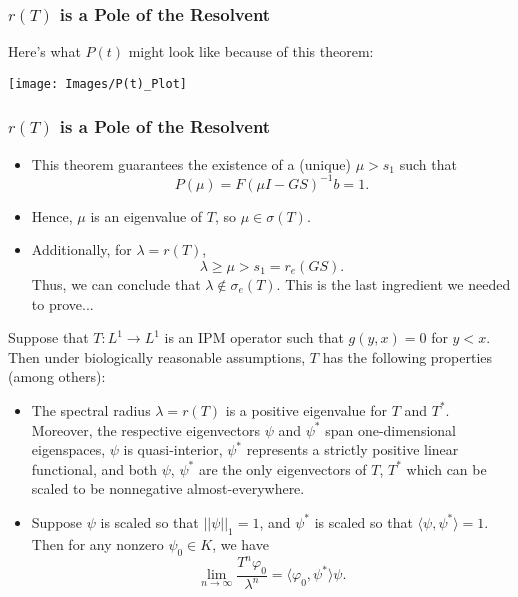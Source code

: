 \documentclass{beamer}
\begin{document}
\begin{frame}
	\frametitle{$r(T)$ is a Pole of the Resolvent}
	Here's what $P(t)$ might look like because of this theorem:
	\pause
\begin{center}
	\texttt{[image: Images/P(t)\_Plot]}
\end{center}
\end{frame}

\begin{frame}
	\frametitle{$r(T)$ is a Pole of the Resolvent}
	\begin{itemize}
		\item This theorem guarantees the existence of a (unique) $\mu > s_1$ such that
		\[P(\mu) = F(\mu I - GS)^{-1}b = 1.\]
		\vspace*{-\baselineskip}
		\pause
		\item Hence, $\mu$ is an eigenvalue of $T$, so $\mu \in \sigma(T)$.
		\pause
		\item Additionally, for $\lambda = r(T)$,
		\[\lambda \geq \mu > s_1 = r_e(GS).\]
		\pause
		Thus, we can conclude that $\lambda \not \in \sigma_e(T)$. This is the last ingredient we needed to prove...
	\end{itemize}
\end{frame}

\begin{frame}
	\begin{theorem}[R., 2020]
	Suppose that $T:L^1 \to L^1$ is an IPM operator such that $g(y, x) = 0$ for $y < x$. Then under biologically reasonable assumptions, $T$ has the following properties (among others):
	\pause
	\begin{itemize}
		\item The spectral radius $\lambda = r(T)$ is a positive eigenvalue for $T$ and $T^*$. Moreover, the respective eigenvectors $\psi$ and $\psi^*$ span one-dimensional eigenspaces, $\psi$ is quasi-interior, $\psi^*$ represents a strictly positive linear functional, and both $\psi$, $\psi^*$ are the only eigenvectors of $T$, $T^*$ which can be scaled to be nonnegative almost-everywhere.
		\pause
		\item Suppose $\psi$ is scaled so that $||\psi||_1 = 1$, and $\psi^*$ is scaled so that $\langle \psi, \psi^* \rangle = 1$. Then for any nonzero $\psi_0 \in K$, we have
		\[\lim_{n \to \infty} \frac{T^n \varphi_0}{\lambda^n} = \langle \varphi_0, \psi^* \rangle \psi.\]			
	\end{itemize}
	\end{theorem}
\end{frame}
\end{document}
